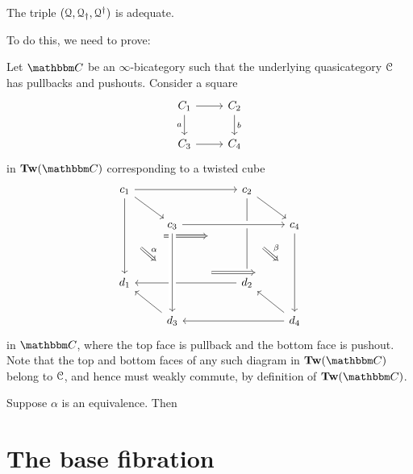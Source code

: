 \documentclass[main.tex]{subfiles}
\begin{document}
\begin{proposition}
  The triple $(\mathcal{Q}, \mathcal{Q}_{\dagger}, \mathcal{Q}^{\dagger})$ is adequate.
\end{proposition}

To do this, we need to prove:
\begin{lemma}
  Let $\CC$ be an $\infty$-bicategory such that the underlying quasicategory $\mathcal{C}$ has pullbacks and pushouts. Consider a square
  \begin{equation*}
    \begin{tikzcd}
      C_{1}
      \arrow[r]
      \arrow[d, swap, "a"]
      & C_{2}
      \arrow[d, "b"]
      \\
      C_{3}
      \arrow[r]
      & C_{4}
    \end{tikzcd}
  \end{equation*}
  in $\Tw(\CC)$ corresponding to a twisted cube
  \begin{equation*}
    \begin{tikzcd}
      c_{1}
      \arrow[rrr]
      \arrow[dr, ""{name=TL, right}]
      \arrow[ddd, ""{name=R1, right}]
      &&& c_{2}
      \arrow[ddd, ""{name=L2, left}, ""{name=R2, right}]
      \arrow[dr, ""{name=TR, left}]
      \arrow[from=R1, to=L2, Rightarrow, shorten=7ex]
      \\
      & c_{3}
      \arrow[rrr, crossing over]
      &&& c_{4}
      \arrow[ddd, ""{name=L4, left}"]
      \\
      \\
      d_{1}
      &&& d_{2}
      \arrow[lll]
      \\
      & d_{3}
      \arrow[from=uuu, crossing over, ""{name=L3, left}, ""{name=R3, right}]
      \arrow[ul]
      &&& d_{4}
      \arrow[lll]
      \arrow[ul]
      \arrow[from=R1, to=L3, Rightarrow, shorten=3ex, "\alpha"]
      \arrow[from=R3, to=L4, Rightarrow, crossing over, shorten=7ex]
      \arrow[from=R2, to=L4, Rightarrow, shorten=3ex, "\beta"]
    \end{tikzcd}
  \end{equation*}
  in $\CC$, where the top face is pullback and the bottom face is pushout. Note that the top and bottom faces of any such diagram in $\Tw(\CC)$ belong to $\mathcal{C}$, and hence must weakly commute, by definition of $\Tw(\CC)$.

  Suppose $\alpha$ is an equivalence. Then 
\end{lemma}

\section{The base fibration}
\label{sec:base_fibrations}
\end{document}
